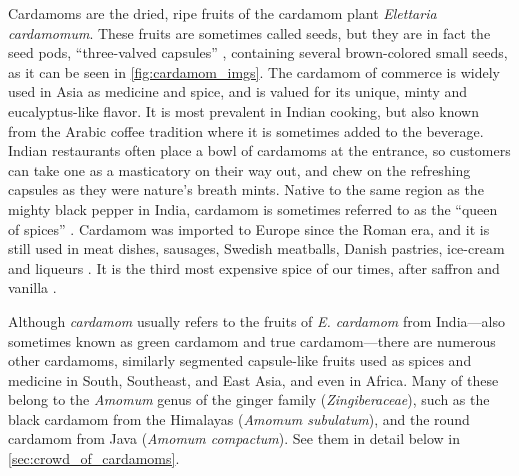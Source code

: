 Cardamoms are the dried, ripe fruits of the cardamom plant \textit{Elettaria cardamomum}. These fruits are sometimes called seeds, but they are in fact the seed pods, ``three-valved capsules'' \autocite[132]{van_wyk_culinary_2014}, containing several brown-colored small seeds, as it can be seen in \cref{fig:cardamom_imgs}. The cardamom of commerce is widely used in Asia as medicine and spice, and is valued for its unique, minty and eucalyptus-like flavor. It is most prevalent in Indian cooking, but also known from the Arabic coffee tradition where it is sometimes added to the beverage. Indian restaurants often place a bowl of cardamoms at the entrance, so customers can take one as a masticatory on their way out, and chew on the refreshing capsules as they were nature's breath mints. Native to the same region as the mighty black pepper in India, cardamom is sometimes referred to as the ``queen of spices'' \autocite[1]{ravindran_cardamom_2002}. Cardamom was imported to Europe since the Roman era, and it is still used in meat dishes, sausages, Swedish meatballs, Danish pastries, ice-cream and liqueurs \autocite[326]{mabberley_mabberleys_2017}. It is the third most expensive spice of our times, after saffron and vanilla \autocite{business_insider_why_2021}.

Although \textit{cardamom} usually refers to the fruits of \textit{E. cardamom} from India---also sometimes known as green cardamom and true cardamom---there are numerous other cardamoms, similarly segmented capsule-like fruits used as spices and medicine in South, Southeast, and East Asia, and even in Africa. Many of these belong to the \textit{Amomum} genus of the ginger family (\textit{Zingiberaceae}), such as the black cardamom from the Himalayas (\textit{Amomum subulatum}), and the round cardamom from Java (\textit{Amomum compactum}). See them in detail below in \cref{sec:crowd_of_cardamoms}.





